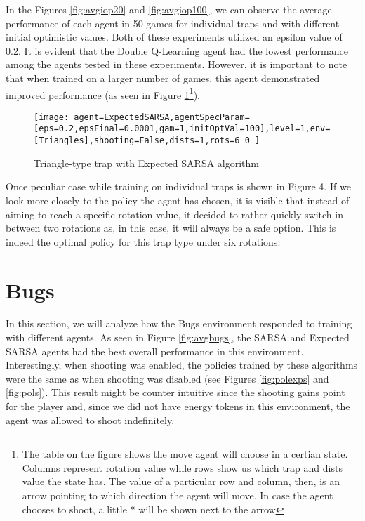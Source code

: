 In the Figures \ref{fig:avgiop20} and \ref{fig:avgiop100}, we can observe the average performance of each agent in 50 games for individual traps and with different initial optimistic values. Both of these experiments utilized an epsilon value of 0.2. It is evident that the Double Q-Learning agent had the lowest performance among the agents tested in these experiments. However, it is important to note that when trained on a larger number of games, this agent demonstrated improved performance (as seen in Figure \ref{fig:dqli}\footnote{The table on the figure shows the move agent will choose in a certian state. Columns represent rotation value while rows show us which trap and dists value the state has. The value of a particular row and column, then, is an arrow pointing to which direction the agent will move. In case the agent chooses to shoot, a little * will be shown next to the arrow}).

\begin{figure}[h]
    \centering
    \texttt{[image: agent=ExpectedSARSA,agentSpecParam=[eps=0.2,epsFinal=0.0001,gam=1,initOptVal=100],level=1,env=[Triangles],shooting=False,dists=1,rots=6\_0
]}
    \caption{Triangle-type trap with Expected SARSA algorithm}
    \label{fig:dqli}
\end{figure}

Once peculiar case while training on individual traps is shown in Figure 4. If we look more closely to the policy the agent has chosen, it is visible that instead of aiming to reach a specific rotation value, it decided to rather quickly switch in between two rotations as, in this case, it will always be a safe option. This is indeed the optimal policy for this trap type under six rotations.

\section{Bugs}
In this section, we will analyze how the Bugs environment responded to training with different agents. As seen in Figure \ref{fig:avgbugs}, the SARSA and Expected SARSA agents had the best overall performance in this environment. Interestingly, when shooting was enabled, the policies trained by these algorithms were the same as when shooting was disabled (see Figures \ref{fig:polexps} and \ref{fig:pols}). This result might be counter intuitive since the shooting gains point for the player and, since we did not have energy tokens in this environment, the agent was allowed to shoot indefinitely.

